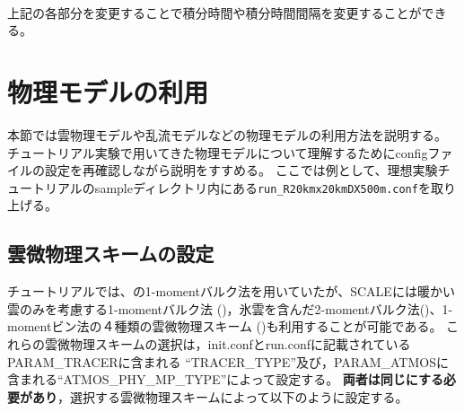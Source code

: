 {\small {\gt
{}}}\\

上記の各部分を変更することで積分時間や積分時間間隔を変更することができる。


\section{物理モデルの利用} \label{sec:adv_physics}
本節では雲物理モデルや乱流モデルなどの物理モデルの利用方法を説明する。
チュートリアル実験で用いてきた物理モデルについて理解するためにconfigファイルの設定を再確認しながら説明をすすめる。
ここでは例として、理想実験チュートリアルのsampleディレクトリ内にある\verb|run_R20kmx20kmDX500m.conf|を取り上げる。


\subsection{雲微物理スキームの設定} \label{sec:adv_microphys}
チュートリアルでは、\cite{tomita_2008}の1-momentバルク法を用いていたが、SCALEには暖かい雲のみを考慮する1-momentバルク法
(\cite{kessler_1969})，氷雲を含んだ2-momentバルク法(\cite{sn_2014})、1-momentビン法の４種類の雲微物理スキーム
(\cite{suzuki_etal_2010})も利用することが可能である。
これらの雲微物理スキームの選択は，init.confとrun.confに記載されているPARAM\_TRACERに含まれる
``TRACER\_TYPE''及び，PARAM\_ATMOSに含まれる``ATMOS\_PHY\_MP\_TYPE''によって設定する。
{\bf 両者は同じにする必要があり}，選択する雲微物理スキームによって以下のように設定する。

